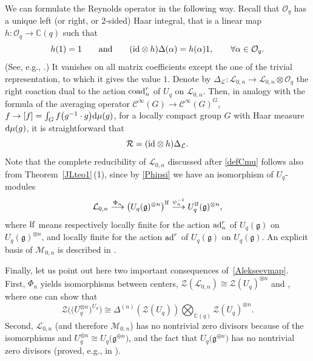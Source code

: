 \documentclass[10pt,a4paper]{amsart}
\numberwithin{equation}{section}
\theoremstyle{definition}
\newcommand{\mc}{\mathbb{C}}
\newcommand{\Ll}{{\mathcal L}}
\newcommand{\Mm}{{\mathcal M}}
\newcommand{\Oo}{{\mathcal O}}
\newcommand{\Rr}{{\mathcal R}}
\newcommand{\ra}{\rightarrow}
\begin{document}
We can formulate the Reynolds operator in the following way. Recall that $\Oo_q$ has a unique left (or right, or $2$-sided) Haar integral, that is a linear map $h\colon \Oo_q\ra \mc(q)$ such that
\[%
h(1)=1 \qquad \text{and}\qquad ({\rm id}\otimes h)\Delta(\alpha) = h(\alpha)1,\qquad \forall \alpha\in \Oo_q.
\]
(See, e.g., \cite[Proposition 13.3.6]{CP}.) It vanishes on all matrix coefficients except the one of the trivial representation, to which it gives the value $1$. Denote by $\Delta_\Ll\colon {\mathcal L}_{0,n} \ra {\mathcal L}_{0,n}\otimes \Oo_q$ the right coaction dual to the action ${\rm coad}_n^r$ of $U_q$ on ${\mathcal L}_{0,n}$. Then, in analogy with the formula of the averaging operator $\mathcal{C}^\infty(G) \ra \mathcal{C}^\infty(G)^G$, $f\ra [f] = \int_G f\big(g^{-1} \cdot g\big) {\rm d}\mu(g)$, for a locally compact group $G$ with Haar measure ${\rm d}\mu(g)$, it is straightforward that
\begin{equation}\label{formuleRh}
\Rr = ({\rm id}\otimes h)\Delta_\Ll .
\end{equation}
Note that the complete reducibility of $\Ll_{0,n}$ discussed after \eqref{defCmu} follows also from Theorem~\ref{JLteo1}\,(1), since by \eqref{Phipsi} we have an isomorphism of $U_q$-modules
\[%
{\mathcal L}_{0,n} \stackrel{\Phi_n}{\longrightarrow} \big(U_q({\mathfrak g})^{\otimes n}\big)^{\rm lf} \stackrel{\psi_n^{-1}}{\longrightarrow}U_q^{\rm lf}({\mathfrak g})^{\otimes n},
\]
where ${\rm lf}$ means respectively locally finite for the action ${\rm ad}_n^r$ of $U_q({\mathfrak g})$ on $U_q({\mathfrak g})^{\otimes n}$, and locally finite for the action ${\rm ad}^r$ of $U_q({\mathfrak g})$ on $U_q({\mathfrak g})$. An explicit basis of $\Mm_{0,n}$ is described in \cite[Pro\-po\-sition~6.22]{BR}.

Finally, let us point out here two important consequences of~\eqref{Alekseevmap}. First, $\Phi_n$ yields isomorphisms between centers, $\mathcal{Z}(\Ll_{0,n}) \cong \mathcal{Z}(U_q)^{\otimes n}$ and \smash{$\mathcal{Z}\big(\Ll_{0,n}^{U_q}\big) \cong \mathcal{Z}\big(\big(U_{q}^{\otimes n}\big)^{U_q}\big)$}, where one can show that \cite[Lemma 6.29]{BR}
\begin{equation}\label{Zinv}
\mathcal{Z}\big(\big(U_{q}^{\otimes n}\big)^{U_q}\big)\cong \Delta^{(n)}(\mathcal{Z}(U_q))\bigotimes_{{\mathbb C}(q)}\mathcal{Z}(U_q)^{\otimes n}.
\end{equation}
Second, $\Ll_{0,n}$ (and therefore $\Mm_{0,n}$) has no nontrivial zero divisors because of the isomorphisms \smash{$\Phi_n\colon \Ll_{0,n} \ra \big(U_q^{\otimes n}\big)^{\rm lf}\subset U_q^{\otimes n}$} and $U_q^{\otimes n}\cong U_q\big(\mathfrak{g}^{\oplus n}\big)$, and the fact that $U_q\big(\mathfrak{g}^{\oplus n}\big)$ has no nontrivial zero divisors (proved, e.g., in \cite{DC-K}).
\end{document}
